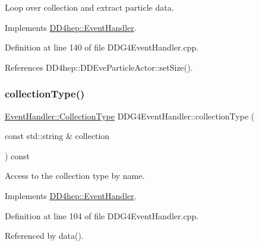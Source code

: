Loop over collection and extract particle data. 



Implements \hyperlink{class_d_d4hep_1_1_event_handler_ae43595c2760736a7ca628183a2c91ec2}{D\+D4hep\+::\+Event\+Handler}.



Definition at line 140 of file D\+D\+G4\+Event\+Handler.\+cpp.



References D\+D4hep\+::\+D\+D\+Eve\+Particle\+Actor\+::set\+Size().

\hypertarget{class_d_d4hep_1_1_d_d_g4_event_handler_acc51cf7d3b3b338c6f5ae1f75582f708}{}\label{class_d_d4hep_1_1_d_d_g4_event_handler_acc51cf7d3b3b338c6f5ae1f75582f708} 
\subsubsection{\texorpdfstring{collection\+Type()}{collectionType()}}
{\footnotesize\ttfamily \hyperlink{class_d_d4hep_1_1_event_handler_a0b22a141a019364495835317fad48254}{Event\+Handler\+::\+Collection\+Type} D\+D\+G4\+Event\+Handler\+::collection\+Type (\begin{DoxyParamCaption}\item[{const std\+::string \&}]{collection }\end{DoxyParamCaption}) const\hspace{0.3cm}{\ttfamily [virtual]}}



Access to the collection type by name. 



Implements \hyperlink{class_d_d4hep_1_1_event_handler_a8424ffc2056b0e23d69c81ab2496cd51}{D\+D4hep\+::\+Event\+Handler}.



Definition at line 104 of file D\+D\+G4\+Event\+Handler.\+cpp.



Referenced by data().

\hypertarget{class_d_d4hep_1_1_d_d_g4_event_handler_aca1f9d6fca9322b89815c68529fac540}{}\label{class_d_d4hep_1_1_d_d_g4_event_handler_aca1f9d6fca9322b89815c68529fac540} 
